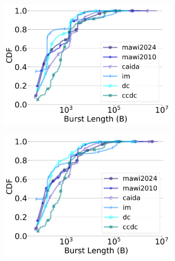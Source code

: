 \begin{figure}[t]
\begin{subfigure}[t]{.24\linewidth}
 \includegraphics[width=\linewidth]{figs/aggregate_ipg_burstsize_cdf_100.pdf}
    \vspace{-7mm}
 \end{subfigure}
 \begin{subfigure}[t]{.24\linewidth}
 \centering
        \centering\includegraphics[width=1\linewidth]{figs/aggregate_ipg_burstsize_cdf_500.pdf}
         \vspace{-7mm}
\end{subfigure}
\begin{subfigure}[t]{.24\linewidth}

\end{subfigure}
\end{figure}
